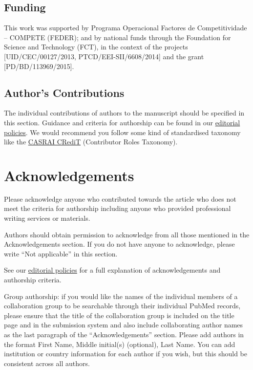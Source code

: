 \documentclass[a4paper,num-refs]{oup-contemporary}
\begin{document}
\subsection{Funding}
This work was supported by Programa Operacional Factores de Competitividade -- COMPETE (FEDER); and by national funds through the Foundation for Science and Technology (FCT), in the context of the projects [UID/CEC/00127/2013, PTCD/EEI-SII/6608/2014] and the grant [PD/BD/113969/2015].


\subsection{Author's Contributions}

The individual contributions of authors to the manuscript should be specified in this section. Guidance and criteria for authorship can be found in our \href{https://academic.oup.com/gigascience/pages/editorial_policies_and_reporting_standards}{editorial policies}. We would recommend you follow some kind of standardised taxonomy like the \href{http://docs.casrai.org/CRediT}{CASRAI CRediT} (Contributor Roles Taxonomy).


\section{Acknowledgements}

Please acknowledge anyone who contributed towards the article who does not meet the criteria for authorship including anyone who provided professional writing services or materials.

Authors should obtain permission to acknowledge from all those mentioned in the Acknowledgements section. If you do not have anyone to acknowledge, please write ``Not applicable'' in this section.

See our \href{https://academic.oup.com/gigascience/pages/editorial_policies_and_reporting_standards}{editorial policies} for a full explanation of acknowledgements and authorship criteria.

Group authorship: if you would like the names of the individual members of a collaboration group to be searchable through their individual PubMed records, please ensure that the title of the collaboration group is included on the title page and in the submission system and also include collaborating author names as the last paragraph of the “Acknowledgements” section. Please add authors in the format First Name, Middle initial(s) (optional), Last Name. You can add institution or country information for each author if you wish, but this should be consistent across all authors.
\end{document}
